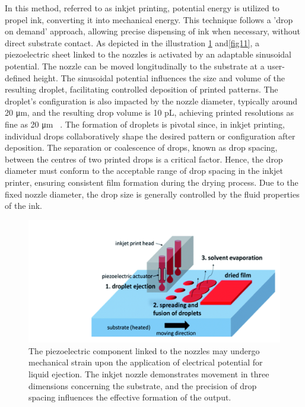 In this method, referred to as inkjet printing, potential energy is utilized to propel ink, converting it into mechanical energy. This technique follows a 'drop on demand' approach, allowing precise dispensing of ink when necessary, without direct substrate contact. As depicted in the illustration \ref{fig9} and\ref{fig11}, a piezoelectric sheet linked to the nozzles is activated by an adaptable sinusoidal potential. The nozzle can be moved longitudinally to the substrate at a user-defined height. The sinusoidal potential influences the size and volume of the resulting droplet, facilitating controlled deposition of printed patterns. The droplet's configuration is also impacted by the nozzle diameter, typically around 20 μm, and the resulting drop volume is 10 pL, achieving printed resolutions as fine as 20 μm ~\cite{ref16}. The formation of droplets is pivotal since, in inkjet printing, individual drops collaboratively shape the desired pattern or configuration after deposition. The separation or coalescence of drops, known as drop spacing, between the centres of two printed drops is a critical factor. Hence, the drop diameter must conform to the acceptable range of drop spacing in the inkjet printer, ensuring consistent film formation during the drying process. Due to the fixed nozzle diameter, the drop size is generally controlled by the fluid properties of the ink.
\begin{figure}[h!]
\centering
\includegraphics[width=1\textwidth]{figures/fig9.png}
\caption[Example of caption.]{The piezoelectric component linked to the nozzles may undergo mechanical strain upon the application of electrical potential for liquid ejection. The inkjet nozzle demonstrates movement in three dimensions concerning the substrate, and the precision of drop spacing influences the effective formation of the output. ~\cite{ref16}\label{fig9}}
\end{figure}

